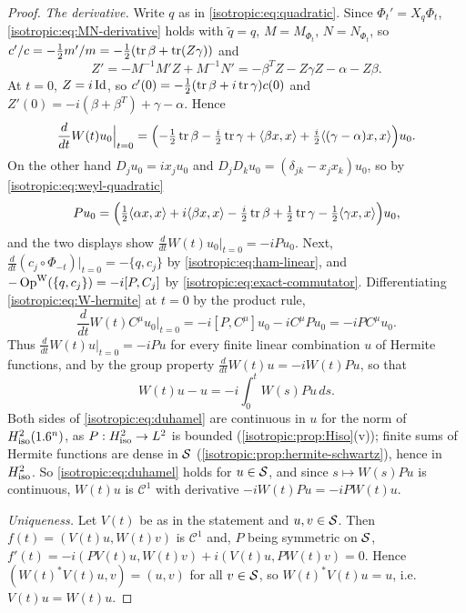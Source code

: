 \begin{proof}
\emph{The derivative.} Write $q$ as in \eqref{isotropic:eq:quadratic}. Since
$\Phi_t'=X_q\Phi_t$, \eqref{isotropic:eq:MN-derivative} holds with
$\tilde q=q$, $M=M_{\Phi_t}$, $N=N_{\Phi_t}$, so
$c'/c=-\frac12m'/m=-\frac12(\operatorname{tr}\beta+\operatorname{tr}(Z\gamma))$ and
\begin{equation*}
  Z'=-M^{-1}M'Z+M^{-1}N'=-\beta^TZ-Z\gamma Z-\alpha-Z\beta .
\end{equation*}
At $t=0$, $Z=i\operatorname{Id}$, so $c'(0)=-\frac12(\operatorname{tr}\beta+i\operatorname{tr}\gamma)c(0)$ and
$Z'(0)=-i(\beta+\beta^T)+\gamma-\alpha$. Hence
\begin{equation*}
  \frac{d}{dt}W(t)u_0\Big|_{t=0}=\Bigl(-\tfrac12\operatorname{tr}\beta-\tfrac i2\operatorname{tr}\gamma+\langle \beta x, x\rangle+\tfrac i2\langle (\gamma-\alpha)x, x\rangle\Bigr)u_0 .
\end{equation*}
On the other hand $D_ju_0=ix_ju_0$ and $D_jD_ku_0=(\delta_{jk}-x_jx_k)u_0$, so by
\eqref{isotropic:eq:weyl-quadratic}
\begin{equation*}
  Pu_0=\Bigl(\tfrac12\langle \alpha x, x\rangle+i\langle \beta x, x\rangle-\tfrac i2\operatorname{tr}\beta+\tfrac12\operatorname{tr}\gamma-\tfrac12\langle \gamma x, x\rangle\Bigr)u_0,
\end{equation*}
and the two displays show $\frac{d}{dt}W(t)u_0|_{t=0}=-iPu_0$. Next,
$\frac{d}{dt}(c_j\circ\Phi_{-t})|_{t=0}=-\{q,c_j\}$ by \eqref{isotropic:eq:ham-linear},
and $-\operatorname{Op}^{\mathrm{W}}(\{q,c_j\})=-i[P,C_j]$ by \eqref{isotropic:eq:exact-commutator}.
Differentiating \eqref{isotropic:eq:W-hermite} at $t=0$ by the product rule,
\begin{equation*}
  \frac{d}{dt}W(t)C^\mu u_0\Big|_{t=0}=-i[P,C^\mu]u_0-iC^\mu Pu_0=-iPC^\mu u_0 .
\end{equation*}
Thus $\frac{d}{dt}W(t)u|_{t=0}=-iPu$ for every finite linear combination $u$ of
Hermite functions, and by the group property
$\frac{d}{dt}W(t)u=-iW(t)Pu$, so that
\begin{equation}\label{isotropic:eq:duhamel}
  W(t)u-u=-i\int_0^tW(s)Pu\,ds .
\end{equation}
Both sides of \eqref{isotropic:eq:duhamel} are continuous in $u$ for the norm of
$H^{2}_{\mathrm{iso}}(1.6^n)$, as $P:H^{2}_{\mathrm{iso}}\to L^2$ is bounded
(\cref{isotropic:prop:Hiso}(v)); finite sums of Hermite functions are dense in
$\mathcal{S}$ (\cref{isotropic:prop:hermite-schwartz}), hence in $H^{2}_{\mathrm{iso}}$. So
\eqref{isotropic:eq:duhamel} holds for $u\in\mathcal{S}$, and since $s\mapsto W(s)Pu$ is
continuous, $W(t)u$ is $\mathcal C^1$ with derivative $-iW(t)Pu=-iPW(t)u$.

\emph{Uniqueness.} Let $V(t)$ be as in the statement and $u,v\in\mathcal{S}$. Then
$f(t)=(V(t)u,W(t)v)$ is $\mathcal C^1$ and, $P$ being symmetric on $\mathcal{S}$,
$f'(t)=-i(PV(t)u,W(t)v)+i(V(t)u,PW(t)v)=0$. Hence
$(W(t)^*V(t)u,v)=(u,v)$ for all $v\in\mathcal{S}$, so $W(t)^*V(t)u=u$, i.e.\
$V(t)u=W(t)u$.
\end{proof}

